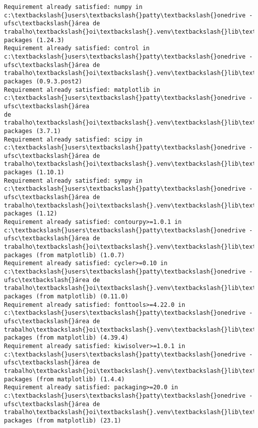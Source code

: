 \documentclass{article}
\begin{document}
    \begin{Verbatim}[commandchars=\\\{\}]
Requirement already satisfied: numpy in c:\textbackslash{}users\textbackslash{}patty\textbackslash{}onedrive - ufsc\textbackslash{}área de
trabalho\textbackslash{}oi\textbackslash{}.venv\textbackslash{}lib\textbackslash{}site-packages (1.24.3)
Requirement already satisfied: control in c:\textbackslash{}users\textbackslash{}patty\textbackslash{}onedrive - ufsc\textbackslash{}área de
trabalho\textbackslash{}oi\textbackslash{}.venv\textbackslash{}lib\textbackslash{}site-packages (0.9.3.post2)
Requirement already satisfied: matplotlib in c:\textbackslash{}users\textbackslash{}patty\textbackslash{}onedrive - ufsc\textbackslash{}área
de trabalho\textbackslash{}oi\textbackslash{}.venv\textbackslash{}lib\textbackslash{}site-packages (3.7.1)
Requirement already satisfied: scipy in c:\textbackslash{}users\textbackslash{}patty\textbackslash{}onedrive - ufsc\textbackslash{}área de
trabalho\textbackslash{}oi\textbackslash{}.venv\textbackslash{}lib\textbackslash{}site-packages (1.10.1)
Requirement already satisfied: sympy in c:\textbackslash{}users\textbackslash{}patty\textbackslash{}onedrive - ufsc\textbackslash{}área de
trabalho\textbackslash{}oi\textbackslash{}.venv\textbackslash{}lib\textbackslash{}site-packages (1.12)
Requirement already satisfied: contourpy>=1.0.1 in c:\textbackslash{}users\textbackslash{}patty\textbackslash{}onedrive -
ufsc\textbackslash{}área de trabalho\textbackslash{}oi\textbackslash{}.venv\textbackslash{}lib\textbackslash{}site-packages (from matplotlib) (1.0.7)
Requirement already satisfied: cycler>=0.10 in c:\textbackslash{}users\textbackslash{}patty\textbackslash{}onedrive -
ufsc\textbackslash{}área de trabalho\textbackslash{}oi\textbackslash{}.venv\textbackslash{}lib\textbackslash{}site-packages (from matplotlib) (0.11.0)
Requirement already satisfied: fonttools>=4.22.0 in c:\textbackslash{}users\textbackslash{}patty\textbackslash{}onedrive -
ufsc\textbackslash{}área de trabalho\textbackslash{}oi\textbackslash{}.venv\textbackslash{}lib\textbackslash{}site-packages (from matplotlib) (4.39.4)
Requirement already satisfied: kiwisolver>=1.0.1 in c:\textbackslash{}users\textbackslash{}patty\textbackslash{}onedrive -
ufsc\textbackslash{}área de trabalho\textbackslash{}oi\textbackslash{}.venv\textbackslash{}lib\textbackslash{}site-packages (from matplotlib) (1.4.4)
Requirement already satisfied: packaging>=20.0 in c:\textbackslash{}users\textbackslash{}patty\textbackslash{}onedrive -
ufsc\textbackslash{}área de trabalho\textbackslash{}oi\textbackslash{}.venv\textbackslash{}lib\textbackslash{}site-packages (from matplotlib) (23.1)

\end{Verbatim}
\end{document}

